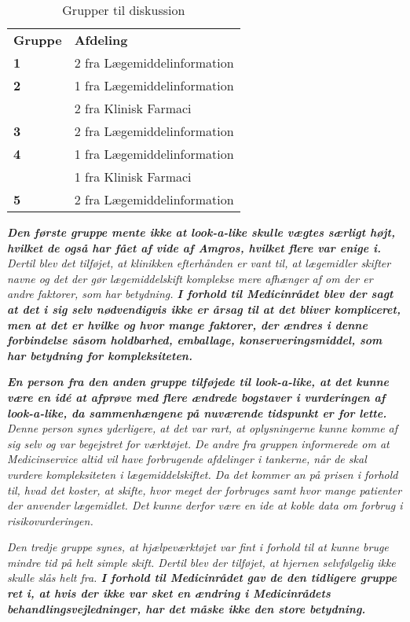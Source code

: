 \begin{table}[H]
\caption{Grupper til diskussion}
\vspace{2mm}
\label{table:grupper}
\centering
\begin{tabular}{l|l}
\rowcolor[HTML]{C0C0C0} \textbf{Gruppe} & \textbf{Afdeling} \\
\textbf{1} & 2 fra Lægemiddelinformation \\ \hline
\textbf{2} \multirow{2}{*}{} & 1 fra Lægemiddelinformation \\  & 2 fra  Klinisk Farmaci\\ \hline
\textbf{3} & 2 fra Lægemiddelinformation \\ \hline
\textbf{4}\multirow{2}{*}{} & 1 fra Lægemiddelinformation \\  & 1 fra Klinisk Farmaci \\ \hline
\textbf{5} & 2 fra Lægemiddelinformation \\ 
\end{tabular}
\end{table}

\textit{\textbf{Den første gruppe mente ikke at look-a-like skulle vægtes særligt højt, hvilket de også har fået af vide af Amgros, hvilket flere var enige i.} Dertil blev det tilføjet, at klinikken efterhånden er vant til, at lægemidler skifter navne og det der gør lægemiddelskift komplekse mere afhænger af om der er andre faktorer, som har betydning.\textbf{ I forhold til Medicinrådet blev der sagt at det i sig selv nødvendigvis ikke er årsag til at det bliver kompliceret, men at det er hvilke og hvor mange faktorer, der ændres i denne forbindelse såsom holdbarhed, emballage, konserveringsmiddel, som har betydning for kompleksiteten.}}

\textit{\textbf{En person fra den anden gruppe tilføjede til look-a-like, at det kunne være en idé at afprøve med flere ændrede bogstaver i vurderingen af look-a-like, da sammenhængene på nuværende tidspunkt er for lette.} Denne person synes yderligere, at det var rart, at oplysningerne kunne komme af sig selv og var begejstret for værktøjet. De andre fra gruppen informerede om at Medicinservice altid vil have forbrugende afdelinger i tankerne, når de skal vurdere kompleksiteten i lægemiddelskiftet. Da det kommer an på prisen i forhold til, hvad det koster, at skifte, hvor meget der forbruges samt hvor mange patienter der anvender lægemidlet. Det kunne derfor være en ide at koble data om forbrug i risikovurderingen.}

\textit{Den tredje gruppe synes, at hjælpeværktøjet var fint i forhold til at kunne bruge mindre tid på helt simple skift. Dertil blev der tilføjet, at hjernen selvfølgelig ikke skulle slås helt fra. \textbf{I forhold til Medicinrådet gav de den tidligere gruppe ret i, at hvis der ikke var sket en ændring i Medicinrådets behandlingsvejledninger, har det måske ikke den store betydning.}}

